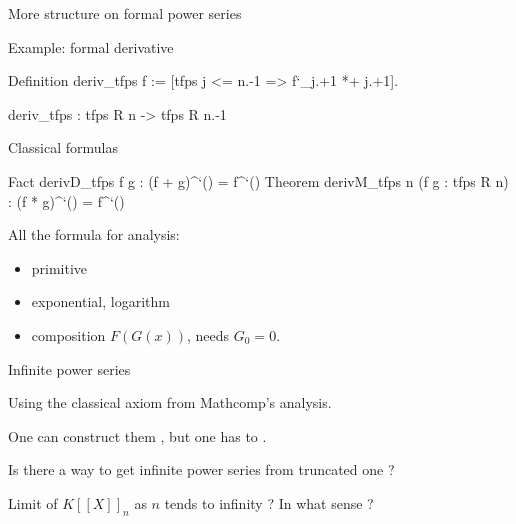 \documentclass[compress,11pt]{beamer}
\begin{document}
\begin{frame}[fragile]{More structure on formal power series}

  Example: formal derivative

\begin{coqcode}
Definition deriv_tfps f := [tfps j <= n.-1 => f`_j.+1 *+ j.+1].

deriv_tfps
     : {tfps R n} -> {tfps R n.-1}
\end{coqcode}

Classical formulas
\begin{coqcode}
Fact derivD_tfps f g : (f + g)^`() = f^`()%
Theorem derivM_tfps n (f g : {tfps R n}) :
  (f * g)^`() = f^`()%
\end{coqcode}
\bigskip\pause

All the formula for analysis:
\begin{itemize}
\item primitive
\item exponential, logarithm
\item composition $F(G(x))$, needs $G_0 = 0$.
\end{itemize}
\end{frame}

\begin{frame}{Infinite power series}

  Using the classical axiom from Mathcomp's analysis.
  \bigskip

  \begin{PROBLEM}
    One can construct them , but one has to .
  \end{PROBLEM}
  \bigskip\bigskip\pause

  \begin{QUESTION}
    Is there a way to get infinite power series from truncated one ?
  \end{QUESTION}
  \bigskip\pause

  Limit of $K[[X]]_n$ as $n$ tends to infinity ? In what sense ?
\end{frame}
\end{document}
